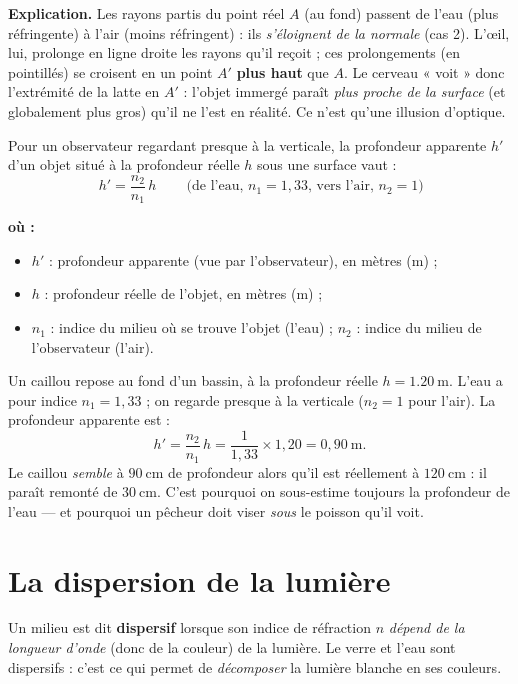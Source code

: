 \documentclass[11pt,a4paper]{article}
\newenvironment{ou}{%
  \par\smallskip\noindent\textbf{où :}\nopagebreak
  \begin{itemize}[leftmargin=1.8em,topsep=2pt,itemsep=1.5pt,parsep=0pt]}%
  {\end{itemize}}
\begin{document}
\textbf{Explication.} Les rayons partis du point réel $A$ (au fond) passent de l'eau (plus
réfringente) à l'air (moins réfringent) : ils \emph{s'éloignent de la normale} (cas 2). L'œil, lui,
prolonge en ligne droite les rayons qu'il reçoit ; ces prolongements (en pointillés) se croisent en
un point $A'$ \textbf{plus haut} que $A$. Le cerveau « voit » donc l'extrémité de la latte en $A'$ :
l'objet immergé paraît \emph{plus proche de la surface} (et globalement plus gros) qu'il ne l'est en
réalité. Ce n'est qu'une illusion d'optique.

\begin{formule}
Pour un observateur regardant presque à la verticale, la profondeur apparente $h'$ d'un objet situé
à la profondeur réelle $h$ sous une surface vaut :
\[ \boxed{\,h' = \dfrac{n_2}{n_1}\,h\,} \qquad\text{(de l'eau, } n_1=1{,}33\text{, vers l'air, } n_2=1\text{)} \]
\begin{ou}
  \item $h'$ : profondeur apparente (vue par l'observateur), en mètres (\si{\metre}) ;
  \item $h$ : profondeur réelle de l'objet, en mètres (\si{\metre}) ;
  \item $n_1$ : indice du milieu où se trouve l'objet (l'eau) ; $n_2$ : indice du milieu de l'observateur (l'air).
\end{ou}
\end{formule}

\begin{exemple}
Un caillou repose au fond d'un bassin, à la profondeur réelle $h = \SI{1.20}{\metre}$. L'eau a pour
indice $n_1 = 1{,}33$ ; on regarde presque à la verticale ($n_2 = 1$ pour l'air). La profondeur
apparente est :
\[ h' = \frac{n_2}{n_1}\,h = \frac{1}{1{,}33}\times 1{,}20 = 0{,}90\ \text{m}. \]
Le caillou \emph{semble} à $\SI{90}{\centi\metre}$ de profondeur alors qu'il est réellement à
$\SI{120}{\centi\metre}$ : il paraît remonté de $\SI{30}{\centi\metre}$. C'est pourquoi on sous-estime
toujours la profondeur de l'eau — et pourquoi un pêcheur doit viser \emph{sous} le poisson qu'il voit.
\end{exemple}

\section{La dispersion de la lumière}
\begin{definition}
Un milieu est dit \textbf{dispersif} lorsque son indice de réfraction $n$ \emph{dépend de la longueur
d'onde} (donc de la couleur) de la lumière. Le verre et l'eau sont dispersifs : c'est ce qui permet
de \emph{décomposer} la lumière blanche en ses couleurs.
\end{definition}
\end{document}
